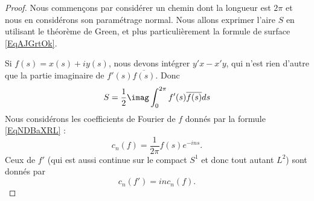 \begin{proof}
    Nous commençons par considérer un chemin dont la longueur est \( 2\pi\) et nous en considérons son paramétrage normal. Nous allons exprimer l'aire \( S\) en utilisant le théorème de Green, et plus particulièrement la formule de surface \eqref{EqAJGrtOk}.

    Si \( f(s)=x(s)+iy(s)\), nous devons intégrer \( y'x-x'y\), qui n'est rien d'autre que la partie imaginaire de \( f'(s)\overline{ f(s) }\). Donc
    \begin{equation}    \label{EqCSWKbPX}
        S=\frac{ 1 }{2}\imag\int_0^{2\pi}f'(s)\overline{ f(s) }ds
    \end{equation}
    Nous considérons les coefficients de Fourier de \( f\) donnés par la formule \eqref{EqNDBaXRL} :
    \begin{equation}
        c_n(f)=\frac{1}{ 2\pi }f(s) e^{-ins}.
    \end{equation}
    Ceux de \( f'\) (qui est aussi continue sur le compact \( S^1\) et donc tout autant \( L^2\)) sont donnés par
    \begin{equation}
        c_n(f')=inc_n(f).
    \end{equation}


\end{proof}

